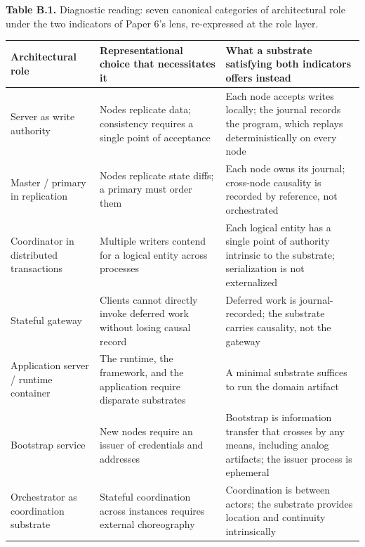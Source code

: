 \documentclass[
]{article}
\newcounter{none} %
\begin{document}
\textbf{Table B.1.} Diagnostic reading: seven canonical categories of
architectural role under the two indicators of Paper 6's lens,
re-expressed at the role layer.

{\def\LTcaptype{none} %
\begin{longtable}[]{@{}
  >{\raggedright\arraybackslash}p{}
  >{\raggedright\arraybackslash}p{}
  >{\raggedright\arraybackslash}p{}@{}}
\toprule\noalign{}
\begin{minipage}[b]{\linewidth}\raggedright
Architectural role
\end{minipage} & \begin{minipage}[b]{\linewidth}\raggedright
Representational choice that necessitates it
\end{minipage} & \begin{minipage}[b]{\linewidth}\raggedright
What a substrate satisfying both indicators offers instead
\end{minipage} \\
\midrule\noalign{}
\endhead
\bottomrule\noalign{}
\endlastfoot
Server as write authority & Nodes replicate data; consistency requires a
single point of acceptance & Each node accepts writes locally; the
journal records the program, which replays deterministically on every
node \\
Master / primary in replication & Nodes replicate state diffs; a primary
must order them & Each node owns its journal; cross-node causality is
recorded by reference, not orchestrated \\
Coordinator in distributed transactions & Multiple writers contend for a
logical entity across processes & Each logical entity has a single point
of authority intrinsic to the substrate; serialization is not
externalized \\
Stateful gateway & Clients cannot directly invoke deferred work without
losing causal record & Deferred work is journal-recorded; the substrate
carries causality, not the gateway \\
Application server / runtime container & The runtime, the framework, and
the application require disparate substrates & A minimal substrate
suffices to run the domain artifact \\
Bootstrap service & New nodes require an issuer of credentials and
addresses & Bootstrap is information transfer that crosses by any means,
including analog artifacts; the issuer process is ephemeral \\
Orchestrator as coordination substrate & Stateful coordination across
instances requires external choreography & Coordination is between
actors; the substrate provides location and continuity intrinsically \\
\end{longtable}
}
\end{document}
